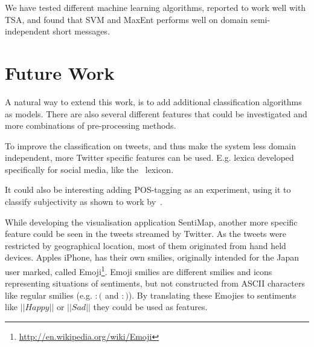 We have tested different machine learning algorithms, reported to work well with TSA, and found that SVM and MaxEnt performs well on domain semi-independent short messages. 

\section{Future Work}

A natural way to extend this work, is to add additional classification algorithms as models. There are also several different features that could be investigated and more combinations of pre-processing methods. 

To improve the classification on tweets, and thus make the system less domain independent, more Twitter specific features can be used. E.g. lexica developed specifically for social media, like the~\citet{article:afinn} lexicon. 

It could also be interesting adding POS-tagging as an experiment, using it to classify subjectivity as shown to work by~\citet{article:pak}.

While developing the visualisation application SentiMap, another more specific feature could be seen in the tweets streamed by Twitter. As the tweets were restricted by geographical location, most of them originated from hand held devices. Apples iPhone, has their own smilies, originally intended for the Japan user marked, called Emoji\footnote{\url{http://en.wikipedia.org/wiki/Emoji}}. Emoji smilies are different smilies and icons representing situations of sentiments, but not constructed from ASCII characters like regular smilies (e.g. $:($ and $:)$). By translating these Emojies to sentiments like $||Happy||$ or $||Sad||$ they could be used as features.